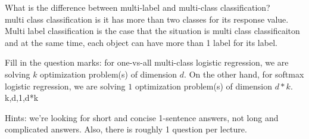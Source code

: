 \documentclass{article}
\def\blu#1{{\color{blu}#1}}
\begin{document}
{\item What is the difference between multi-label and multi-class classification?\\
\blu{multi class classification is it has more than two classes for its response value.  
Multi label classification is the case that the situation is multi class classificaiton and at the same time, each object can have more than 1 label for its label. 
}
\item Fill in the question marks: for one-vs-all multi-class logistic regression, we are solving $k$ optimization problem(s) of dimension $d$. On the other hand, for softmax logistic regression, we are solving $1$ optimization problem(s) of dimension $d*k$.\\
\blu{k,d,1,d*k}
}


Hints: we're looking for short and concise 1-sentence answers, not long and complicated answers. Also, there is roughly 1 question per lecture.
\end{document}
